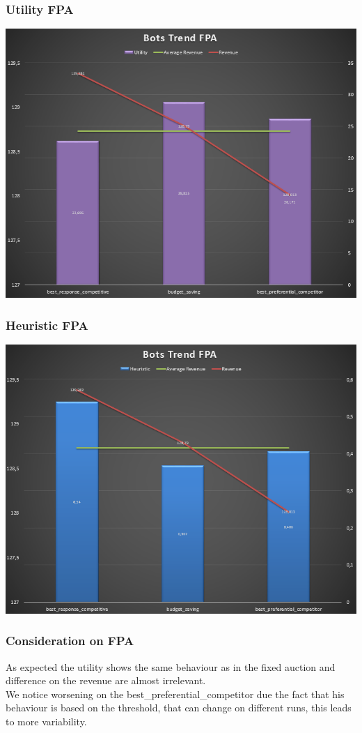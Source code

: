\documentclass{beamer}
\begin{document}
\begin{frame}
\frametitle{Utility FPA}
\begin{center}
\includegraphics[scale=0.46]{img/Auctions/RFPA_all_Utility.PNG} 
\end{center}
\end{frame}

\begin{frame}
\frametitle{Heuristic FPA}
\begin{center}
\includegraphics[scale=0.46]{img/Auctions/RFPA_all_Heuristic.PNG} 
\end{center}
\end{frame}

\begin{frame}
\frametitle{Consideration on FPA}
As expected the utility shows the \alert{same} behaviour as in the fixed auction and difference on the revenue are almost irrelevant.\\
\medskip
We notice \alert{worsening} on the best\_preferential\_competitor due the fact that his behaviour is based on the threshold, that can change on different runs, this leads to more variability. 
\end{frame}
\end{document}
